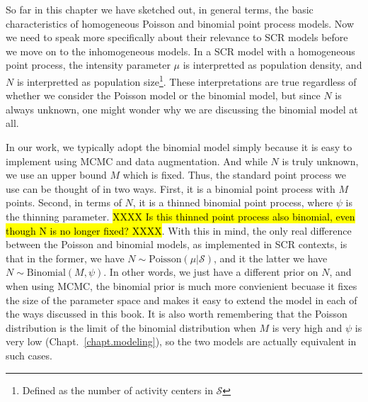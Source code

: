 So far in this chapter we have sketched out, in general terms, the basic characteristics
of homogeneous Poisson and binomial point process models. Now we need
to speak more specifically about their relevance to SCR models before we move on
to the inhomogeneous models.
In a SCR model with a homogeneous point process, the intensity
parameter $\mu$ is interpretted as population density, and $N$ is
interpretted as population size\footnote{Defined as the number of activity centers in
$\mathcal{S}$}. These interpretations are true regardless of whether we consider the
Poisson model or the binomial model, but since $N$ is always unknown, one
might wonder why we are discussing the binomial model at all. %

In our work, we typically adopt the binomial model simply
because it is easy to implement using MCMC and data
augmentation. And while $N$ is truly unknown, we use an upper bound $M$
which is fixed. Thus, the standard point process we use can be thought
of in two ways. First, it is a binomial point process with $M$
points. Second, in terms of $N$, it is a thinned binomial point
process, where $\psi$ is the thinning parameter.
\hl{XXXX Is this thinned point process also binomial, even though N is
  no longer fixed? XXXX}.
With this in mind,
the only real difference between the Poisson and binomial models, as
implemented in SCR contexts, is that in the former, we have
$N \sim \text{Poisson}(\mu|\mathcal{S})$, and it the latter we have
$N \sim \text{Binomial}(M, \psi)$. In other words, we just have a
different prior on $N$, and when using MCMC, the binomial prior is
much more convienient becuase it fixes the size of the parameter space
and makes it easy to extend the model in each of the ways discussed in
this book. It is also worth remembering that the Poisson
distribution is the limit of the binomial distribution when $M$ is
very high and $\psi$ is very low (Chapt.~\ref{chapt.modeling}), so the two models are actually
equivalent in such cases.

